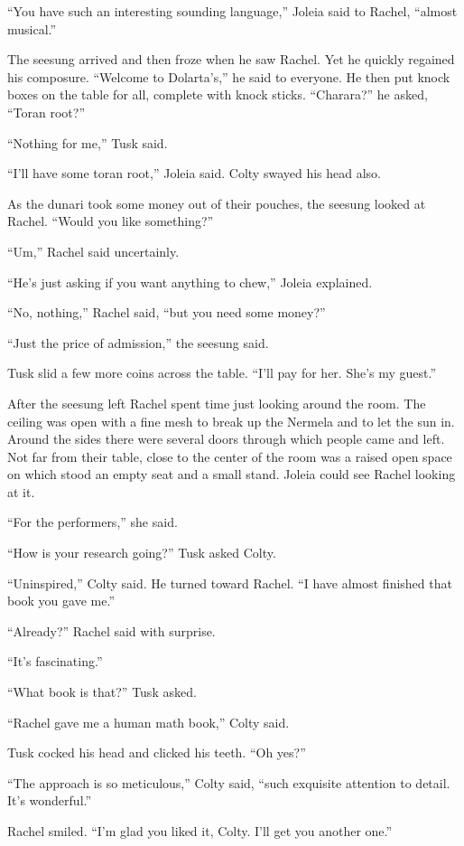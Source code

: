 ``You have such an interesting sounding language,'' Joleia said to Rachel, ``almost musical.''

The seesung arrived and then froze when he saw Rachel. Yet he quickly regained his composure.
``Welcome to Dolarta's,'' he said to everyone. He then put knock boxes on the table for all,
complete with knock sticks. ``Charara?'' he asked, ``Toran root?''

``Nothing for me,'' Tusk said.

``I'll have some toran root,'' Joleia said. Colty swayed his head also.

As the dunari took some money out of their pouches, the seesung looked at Rachel. ``Would you
like something?''

``Um,'' Rachel said uncertainly.

``He's just asking if you want anything to chew,'' Joleia explained.

``No, nothing,'' Rachel said, ``but you need some money?''

``Just the price of admission,'' the seesung said.

Tusk slid a few more coins across the table. ``I'll pay for her. She's my guest.''

After the seesung left Rachel spent time just looking around the room. The ceiling was open with
a fine mesh to break up the Nermela and to let the sun in. Around the sides there were several
doors through which people came and left. Not far from their table, close to the center of the
room was a raised open space on which stood an empty seat and a small stand. Joleia could see
Rachel looking at it.

``For the performers,'' she said.

``How is your research going?'' Tusk asked Colty.

``Uninspired,'' Colty said. He turned toward Rachel. ``I have almost finished that book you gave
me.''

``Already?'' Rachel said with surprise.

``It's fascinating.''

``What book is that?'' Tusk asked.

``Rachel gave me a human math book,'' Colty said.

Tusk cocked his head and clicked his teeth. ``Oh yes?''

``The approach is so meticulous,'' Colty said, ``such exquisite attention to detail. It's
wonderful.''

Rachel smiled. ``I'm glad you liked it, Colty. I'll get you another one.''

